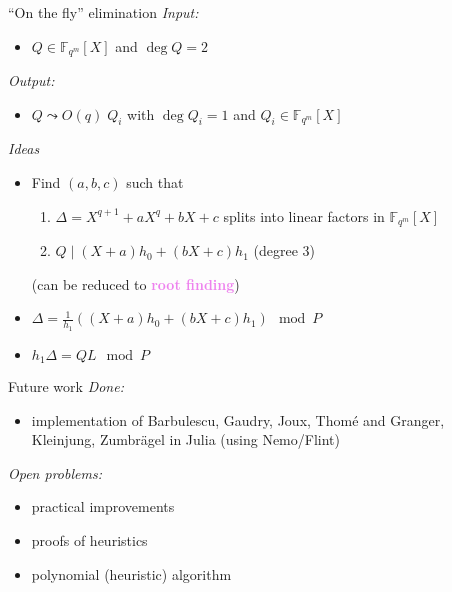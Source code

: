 \documentclass[xcolor=x11names,compress]{beamer}
\theoremstyle{break}
\theoremstyle{sc}
\theoremstyle{definition}
\theoremstyle{remark}
\begin{document}
\begin{frame}{``On the fly'' elimination}
  \emph{Input:}
  \begin{itemize}
    \item $Q\in \mathbb{F}_{q^m}[X]$ and $\deg Q = 2$
  \end{itemize}
  \emph{Output:}
  \begin{itemize}
    \item $Q\leadsto O(q)\; Q_i$ with $\deg Q_i = 1$ and $Q_i\in
      \mathbb{F}_{q^m}[X]$
  \end{itemize}

  \emph{Ideas}
  \begin{itemize}
    \item Find $(a, b, c)$ such that
      \begin{enumerate}
        \item $\Delta = X^{q+1}+aX^q+bX+c$ splits into linear factors in $\mathbb{F}_{q^m}[X]$
        \item $Q\;|\; (X+a)h_0 + (bX+c)h_1$ (degree $3$)
      \end{enumerate}
      (can be reduced to \textcolor{violet}{\textbf{root finding}})
    \item $ \Delta = \frac{1}{h_1}((X+a)h_0 + (bX+c)h_1)\mod P $
    \item $ h_1\Delta=QL \mod P$
      
  \end{itemize}
\end{frame}

\begin{frame}{Future work}
  \emph{Done:}
  \begin{itemize}
    \item implementation of Barbulescu, Gaudry, Joux, Thomé and Granger,
      Kleinjung, Zumbrägel in Julia (using Nemo/Flint)
  \end{itemize}
  \emph{Open problems:}
  \begin{itemize}
    \item practical improvements
    \item proofs of heuristics
    \item polynomial (heuristic) algorithm
  \end{itemize}

\end{frame}

\end{document}
